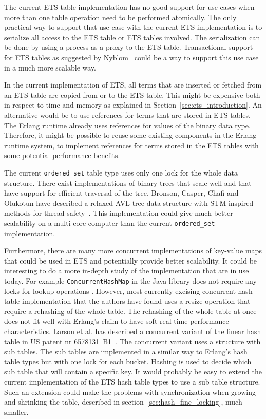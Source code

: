 \documentclass[aps,pre,preprint,nofootinbib]{revtex4}
\begin{document}
The current ETS table implementation has no good support for use cases when more than one table operation need to be performed atomically.
The only practical way to support that use case with the current ETS implementation is to serialize all access to the ETS table or ETS tables involved.
The serialization can be done by using a process as a proxy to the ETS table.
Transactional support for ETS tables as suggested by Nyblom~\cite{PatrikErlangTrans} could be a way to support this use case in a much more scalable way.

In the current implementation of ETS, all terms that are inserted or fetched from an ETS table are copied from or to the ETS table.
This might be expensive both in respect to time and memory as explained in Section~\ref{sec:ets_introduction}.
An alternative would be to use references for terms that are stored in ETS tables.
The Erlang runtime already uses references for values of the binary data type.
Therefore, it might be possible to reuse some existing components in the Erlang runtime system, to implement references for terms stored in the ETS tables with some potential performance benefits.

The current \verb|ordered_set| table type uses only one lock for the whole data structure.
There exist implementations of binary trees that scale well and that have support for efficient traversal of the tree.
Bronson, Casper, Chafi and Olukotun have described a relaxed AVL-tree data-structure with STM inspired methods for thread safety~\cite{BronsonPracTree}.
This implementation could give much better scalability on a multi-core computer than the current \verb|ordered_set| implementation.

Furthermore, there are many more concurrent implementations of key-value maps that could be used in ETS and potentially provide better scalability.
It could be interesting to do a more in-depth study of the implementation that are in use today.
For example \verb|ConcurrentHashMap| in the Java library does not require any locks for lookup operations \cite{BrianConcHashMap}.
However, most currently excising concurrent hash table implementation that the authors have found uses a resize operation that require a rehashing of the whole table.
The rehashing of the whole table at once does not fit well with Erlang's claim to have soft real-time performance characteristics.
Larson et al. has described a concurrent variant of the linear hash table in US patent nr 6578131~B1~\cite{USPATENT6578131B1}.
The concurrent variant uses a structure with sub tables.
The sub tables are implemented in a similar way to Erlang's hash table types but with one lock for each bucket.
Hashing is used to decide which sub table that will contain a specific key.
It would probably be easy to extend the current implementation of the ETS hash table types to use a sub table structure.
Such an extension could make the problems with synchronization when growing and shrinking the table, described in section~\ref{sec:hash_fine_locking}, much smaller.




\end{document}
